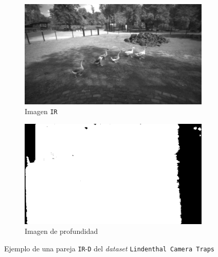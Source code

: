 \documentclass[12pt,a4paper]{report}
\begin{document}
\begin{figure}
    \centering
    \begin{subfigure}{0.45\textwidth}
        \centering
        \includegraphics[width=\textwidth]{media/data/ir_gueese.jpg}
        \caption{Imagen \texttt{IR}}
    \end{subfigure}
    \hfill
    \begin{subfigure}{0.45\textwidth}
        \centering
        \includegraphics[width=\textwidth]{media/data/depth_gueese.png}
        \caption{Imagen de profundidad}
    \end{subfigure}
    \caption{Ejemplo de una pareja \texttt{IR}-\texttt{D} del \textit{dataset} \texttt{Lindenthal Camera Traps}}
    \label{fig:base-data-lindenthal}
\end{figure}
\end{document}

